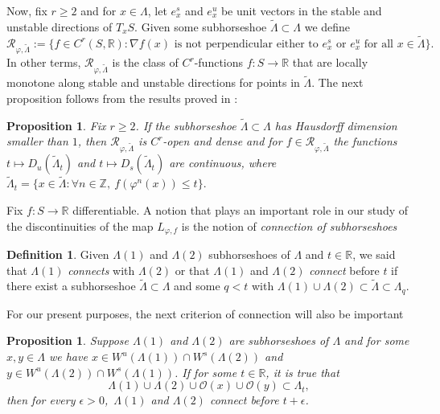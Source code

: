 \documentclass[12pt]{amsart}
\newcommand{\grad}{\nabla}
\theoremstyle{plain} %
\newtheorem{proposition}[theorem]{Proposition}
\theoremstyle{definition} %
\newtheorem{definition}[theorem]{Definition}
\numberwithin{equation}{section}
\begin{document}
Now, fix $r\geq 2$ and for $x\in \Lambda$, let $e^s_x$ and $e^u_x$ be unit vectors in the stable and unstable directions of $T_xS$. Given some subhorseshoe $\tilde{\Lambda}\subset\Lambda$ we define
$$\mathcal{R}_{\varphi, \tilde{\Lambda}}:=\{f\in C^r(S,\mathbb{R}): \grad f(x) \textrm{ is not perpendicular either to } e^s_x \textrm{  or } e^u_x \textrm{ for all } x\in\tilde{\Lambda}\}.$$ 
In other terms, $\mathcal{R}_{\varphi, \tilde{\Lambda}}$ is the class of $C^r$-functions $f:S\to\mathbb{R}$ that are locally monotone along stable and unstable directions for points in $\tilde{\Lambda}$. The next proposition follows from the results proved in \cite[Remark 1.4]{CMM16}:
\begin{proposition}\label{R-generic} Fix $r\geq 2$. If the subhorseshoe $\tilde{\Lambda}\subset\Lambda$ has Hausdorff dimension smaller than $1$, then $\mathcal{R}_{\varphi, \tilde{\Lambda}}$ is $C^r$-open and dense and for $f\in\mathcal{R}_{\varphi, \tilde{\Lambda}}$ the functions $t\mapsto D_u(\tilde{\Lambda}_{t})$ and $t\mapsto D_s(\tilde{\Lambda}_{t})$ are continuous, where $\tilde{\Lambda}_t = \{x\in\tilde{\Lambda}: \forall n\in \mathbb{Z}, \ f(\varphi^n(x))\leq t\}.$
\end{proposition}

Fix $f:S\rightarrow \mathbb{R}$  differentiable. A notion that plays an important role in our study of the discontinuities of the map $L_{\varphi, f}$ is the notion of \textit{connection of subhorseshoes} 

\begin{definition}\label{conection of horseshoes1}
Given $\Lambda(1)$ and $\Lambda(2)$ subhorseshoes of $\Lambda$ and $t\in \mathbb{R}$, we said that $\Lambda(1)$ \emph{connects} with $\Lambda(2)$ or that $\Lambda(1)$ and $\Lambda(2)$ \emph{connect} before $t$ if there exist a subhorseshoe $\tilde{\Lambda}\subset \Lambda$ and some $q< t$ with $\Lambda(1) \cup \Lambda(2) \subset \tilde{\Lambda}\subset \Lambda_q$.
\end{definition}

For our present purposes, the next criterion of connection will also be important

\begin{proposition}\label{connection11}
Suppose $\Lambda(1)$ and $\Lambda(2)$ are subhorseshoes of $\Lambda$ and for some $x,y \in \Lambda$ we have $x\in W^u(\Lambda(1))\cap W^s(\Lambda(2))$ and $y\in W^u(\Lambda(2))\cap W^s(\Lambda(1))$. If for some $t\in \mathbb{R}$, it is true that 
$$\Lambda(1) \cup \Lambda(2) \cup \mathcal{O}(x) \cup \mathcal{O}(y) \subset \Lambda_t,$$ then for every $\epsilon >0$,\ $\Lambda(1)$ and $\Lambda(2)$ connect before $t+\epsilon$. 
\end{proposition}
\end{document}
